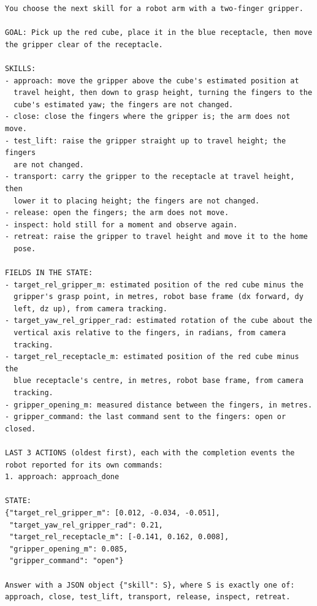 \documentclass[11pt]{article}
\begin{document}
{\small
\begin{verbatim}
You choose the next skill for a robot arm with a two-finger gripper.

GOAL: Pick up the red cube, place it in the blue receptacle, then move
the gripper clear of the receptacle.

SKILLS:
- approach: move the gripper above the cube's estimated position at
  travel height, then down to grasp height, turning the fingers to the
  cube's estimated yaw; the fingers are not changed.
- close: close the fingers where the gripper is; the arm does not move.
- test_lift: raise the gripper straight up to travel height; the fingers
  are not changed.
- transport: carry the gripper to the receptacle at travel height, then
  lower it to placing height; the fingers are not changed.
- release: open the fingers; the arm does not move.
- inspect: hold still for a moment and observe again.
- retreat: raise the gripper to travel height and move it to the home
  pose.

FIELDS IN THE STATE:
- target_rel_gripper_m: estimated position of the red cube minus the
  gripper's grasp point, in metres, robot base frame (dx forward, dy
  left, dz up), from camera tracking.
- target_yaw_rel_gripper_rad: estimated rotation of the cube about the
  vertical axis relative to the fingers, in radians, from camera
  tracking.
- target_rel_receptacle_m: estimated position of the red cube minus the
  blue receptacle's centre, in metres, robot base frame, from camera
  tracking.
- gripper_opening_m: measured distance between the fingers, in metres.
- gripper_command: the last command sent to the fingers: open or closed.

LAST 3 ACTIONS (oldest first), each with the completion events the
robot reported for its own commands:
1. approach: approach_done

STATE:
{"target_rel_gripper_m": [0.012, -0.034, -0.051],
 "target_yaw_rel_gripper_rad": 0.21,
 "target_rel_receptacle_m": [-0.141, 0.162, 0.008],
 "gripper_opening_m": 0.085,
 "gripper_command": "open"}

Answer with a JSON object {"skill": S}, where S is exactly one of:
approach, close, test_lift, transport, release, inspect, retreat.
\end{verbatim}
}
\end{document}
